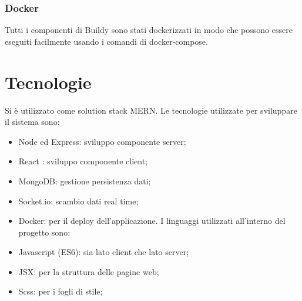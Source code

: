 \documentclass{report}
\begin{document}
\subsubsection{Docker}
Tutti i componenti di Buildy sono stati dockerizzati in modo che possono essere eseguiti facilmente usando i comandi di docker-compose.
\section{Tecnologie}
Si è utilizzato come solution stack MERN.
Le tecnologie utilizzate per sviluppare il sistema sono:
\begin{itemize}
\item  Node ed Express: sviluppo componente server;
\item React : sviluppo componente client;
\item MongoDB: gestione persistenza dati;
\item Socket.io: scambio dati real time;
\item Docker: per il deploy dell’applicazione.
I linguaggi utilizzati all’interno del progetto sono:
\item Javascript (ES6): sia lato client che lato server;
\item JSX: per la struttura delle pagine web;
\item Scss: per i fogli di stile;
\end{itemize}
\end{document}
